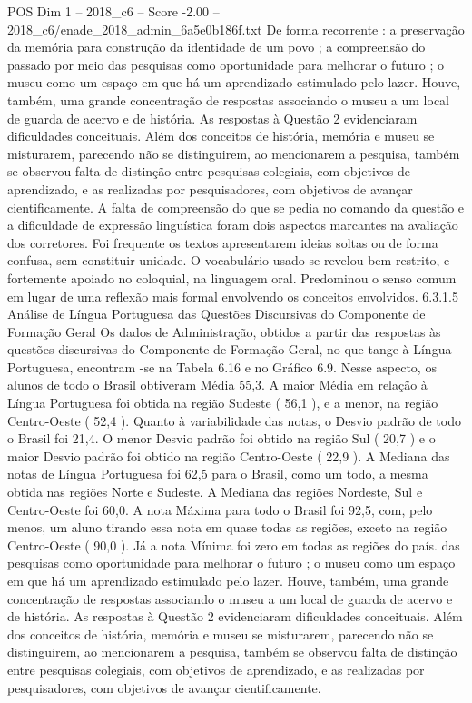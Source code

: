 \begin{textsample}{POS Dim 1 – 2018\_c6 – Score -2.00 – 2018\_c6/enade\_2018\_admin\_6a5e0b186f.txt}
De forma recorrente : a preservação da memória para construção da identidade de um povo ; a compreensão do passado por meio das pesquisas como oportunidade para melhorar o futuro ; o museu como um espaço em que há um aprendizado estimulado pelo lazer.
Houve, também, uma grande concentração de respostas associando o museu a um local de guarda de acervo e de história.
As respostas à Questão 2 evidenciaram dificuldades conceituais.
Além dos conceitos de história, memória e museu se misturarem, parecendo não se distinguirem, ao mencionarem a pesquisa, também se observou falta de distinção entre pesquisas colegiais, com objetivos de aprendizado, e as realizadas por pesquisadores, com objetivos de avançar cientificamente.
A falta de compreensão do que se pedia no comando da questão e a dificuldade de expressão linguística foram dois aspectos marcantes na avaliação dos corretores.
Foi frequente os textos apresentarem ideias soltas ou de forma confusa, sem constituir unidade.
O vocabulário usado se revelou bem restrito, e fortemente apoiado no coloquial, na linguagem oral.
Predominou o senso comum em lugar de uma reflexão mais formal envolvendo os conceitos envolvidos. 6.3.1.5 Análise de Língua Portuguesa das Questões Discursivas do Componente de Formação Geral Os dados de Administração, obtidos a partir das respostas às questões discursivas do Componente de Formação Geral, no que tange à Língua Portuguesa, encontram -se na Tabela 6.16 e no Gráfico 6.9.
Nesse aspecto, os alunos de todo o Brasil obtiveram Média 55,3.
A maior Média em relação à Língua Portuguesa foi obtida na região Sudeste ( 56,1 ), e a menor, na região Centro-Oeste ( 52,4 ).
Quanto à variabilidade das notas, o Desvio padrão de todo o Brasil foi 21,4.
O menor Desvio padrão foi obtido na região Sul ( 20,7 ) e o maior Desvio padrão foi obtido na região Centro-Oeste ( 22,9 ).
A Mediana das notas de Língua Portuguesa foi 62,5 para o Brasil, como um todo, a mesma obtida nas regiões Norte e Sudeste.
A Mediana das regiões Nordeste, Sul e Centro-Oeste foi 60,0.
A nota Máxima para todo o Brasil foi 92,5, com, pelo menos, um aluno tirando essa nota em quase todas as regiões, exceto na região Centro-Oeste ( 90,0 ).
Já a nota Mínima foi zero em todas as regiões do país. das pesquisas como oportunidade para melhorar o futuro ; o museu como um espaço em que há um aprendizado estimulado pelo lazer.
Houve, também, uma grande concentração de respostas associando o museu a um local de guarda de acervo e de história.
As respostas à Questão 2 evidenciaram dificuldades conceituais.
Além dos conceitos de história, memória e museu se misturarem, parecendo não se distinguirem, ao mencionarem a pesquisa, também se observou falta de distinção entre pesquisas colegiais, com objetivos de aprendizado, e as realizadas por pesquisadores, com objetivos de avançar cientificamente.

\end{textsample}
